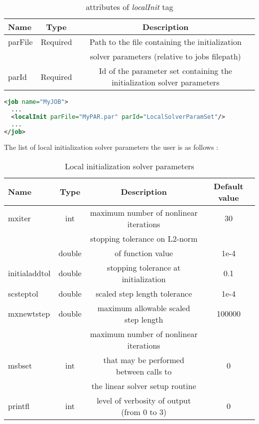\documentclass[a4paper, 12pt]{report}
\begin{document}
\begin{table}[H]
\center
\begin{tabular}{ l | c | c }
\toprule
\textbf{{Name}} & \textbf{{Type}} & \textbf{{Description}}\\
\midrule
\rowcolor{white}
\small{parFile} & \small{Required} & \small{Path to the file containing the initialization}\\
 &  & \small{solver parameters (relative to jobs filepath)}\\
\rowcolor{gray!10}
\small{parId} & \small{Required} & \small{Id of the parameter set containing the initialization solver parameters}\\
\bottomrule
\end{tabular}
\caption{attributes of \textit{localInit} tag}
\end{table}

\begin{lstlisting}[language=XML, morekeywords={network}]
<job name="MyJOB">
  ...
  <localInit parFile="MyPAR.par" parId="LocalSolverParamSet"/>
  ...
</job>
\end{lstlisting}

The list of local initialization solver parameters the user is as follows :

\begin{table}[H]
\center
\begin{tabular}{ l | c | c | c }
\toprule
\textbf{{Name}} & \textbf{{Type}} & \textbf{{Description}} & \textbf{{Default value}}\\
\midrule
\rowcolor{white}
\small{mxiter} & \small{int} & \small{maximum number of nonlinear iterations} & \small{30} \\
\rowcolor{gray!10}
 &  & \small{stopping tolerance on L2-norm} &  \\
\rowcolor{gray!10}
\multirow{-2}{*}{\small{fnormtol}} & \multirow{-2}{*}{\small{double}} & \small{of function value} & \multirow{-2}{*}{\small{1e-4}} \\
\rowcolor{white}
\small{initialaddtol} & \small{double} & \small{stopping tolerance at initialization} & \small{0.1} \\
\rowcolor{gray!10}
\small{scsteptol} & \small{double} & \small{scaled step length tolerance} & \small{1e-4} \\
\rowcolor{white}
\small{mxnewtstep} & \small{double} & \small{maximum allowable scaled step length} & \small{100000} \\
\rowcolor{gray!10}
 &  & \small{maximum number of nonlinear iterations} &  \\
\rowcolor{gray!10}
\small{msbset} & \small{int} & \small{that may be performed between calls to} & \small{0} \\
\rowcolor{gray!10}
 &  & \small{the linear solver setup routine} &  \\
 \rowcolor{gray!10}
\rowcolor{white}
\small{printfl} & \small{int} & \small{level of verbosity of output (from 0 to 3)} & \small{0} \\
\bottomrule
\end{tabular}
\caption{Local initialization solver parameters}
\end{table}
\end{document}

